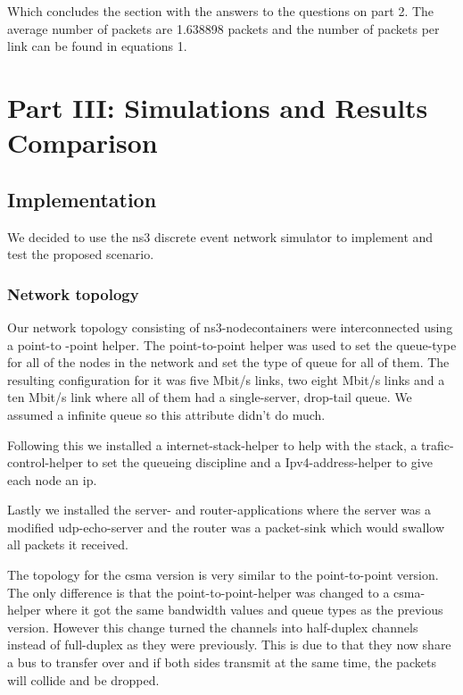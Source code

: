 \documentclass{article}
\begin{document}
Which concludes the section with the answers to the questions on part 2. The average number of packets are 1.638898
packets and the number of packets per link can be found in equations 1.


\section{Part III: Simulations and Results Comparison} \label{part3}

\subsection{Implementation}
We decided to use the ns3 discrete event network simulator to implement and test the proposed scenario.



\subsubsection{Network topology}
Our network topology consisting of ns3-nodecontainers were interconnected using a point-to
-point helper. The point-to-point helper was used to set the queue-type for all of the
nodes in the network and set the type of queue for all of them. The resulting configuration
for it was five Mbit/s links, two eight Mbit/s links and a ten Mbit/s link where all of
them had a single-server, drop-tail queue. We assumed a infinite queue so this attribute
didn't do much. 

Following this we installed a internet-stack-helper to help with the stack, a
trafic-control-helper to set the queueing discipline and a Ipv4-address-helper to give each
node an ip. 

Lastly we installed the server- and router-applications where the server was a modified
udp-echo-server and the router was a packet-sink which would swallow all packets it
received. 

The topology for the csma version is very similar to the point-to-point version. The only
difference is that the point-to-point-helper was changed to a csma-helper where it got the
same bandwidth values and queue types as the previous version. However this change turned
the channels into half-duplex channels instead of full-duplex as they were previously. This
is due to that they now share a bus to transfer over and if both sides transmit at the same
time, the packets will collide and be dropped.
\end{document}
